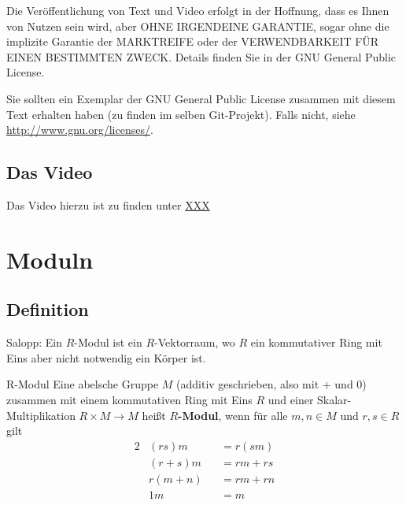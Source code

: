 \documentclass[a4paper]{amsart}
\theoremstyle{definition}
\begin{document}
Die Veröffentlichung von Text und Video erfolgt in der Hoffnung, dass es Ihnen von Nutzen sein wird,
aber OHNE IRGENDEINE GARANTIE, sogar ohne die implizite Garantie der MARKTREIFE oder der
VERWENDBARKEIT FÜR EINEN BESTIMMTEN ZWECK. Details finden Sie in der GNU General Public License.

Sie sollten ein Exemplar der GNU General Public License zusammen mit diesem Text erhalten haben
(zu finden im selben Git-Projekt).
Falls nicht, siehe \url{http://www.gnu.org/licenses/}.

\subsection*{Das Video}
Das Video hierzu ist zu finden unter
{\tiny
   \url{XXX}
}

\section{Moduln}

\subsection{Definition}
Salopp: Ein $R$-Modul ist ein $R$-Vektorraum, wo $R$ ein kommutativer Ring mit Eins aber nicht notwendig ein Körper ist.

\begin{Definition}{R-Modul}
   Eine abelsche Gruppe $M$ (additiv geschrieben, also mit $+$ und $0$) zusammen mit einem kommutativen Ring mit Eins $R$ und einer Skalar- Multiplikation $R \times M \to M$ heißt $R$\textbf{-Modul}, wenn für alle $m,n \in M$ und $r, s \in R$ gilt 
   \begin{alignat}{2}
      &(rs)m &&= r(sm)\\
      &(r+s)m &&= rm + rs\\
      &r(m+n) &&= rm +rn\\
      &1m &&= m
   \end{alignat}
\end{Definition}
\end{document}

